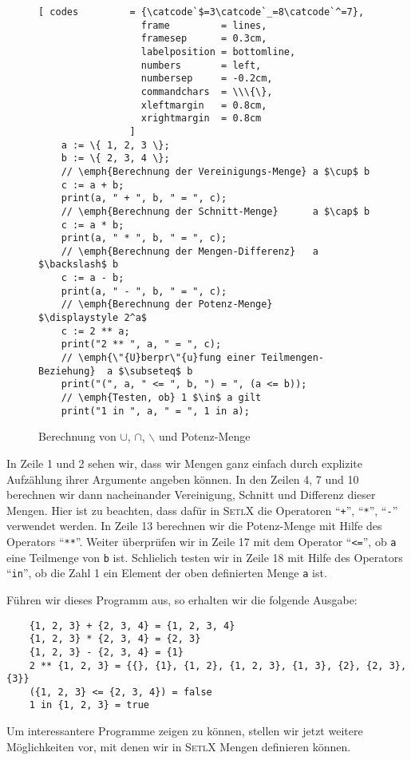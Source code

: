 \begin{figure}[!ht]
  \centering
\begin{Verbatim}[ codes         = {\catcode`$=3\catcode`_=8\catcode`^=7},
                  frame         = lines, 
                  framesep      = 0.3cm, 
                  labelposition = bottomline,
                  numbers       = left,
                  numbersep     = -0.2cm,
                  commandchars  = \\\{\},
                  xleftmargin   = 0.8cm,
                  xrightmargin  = 0.8cm
                ]
    a := \{ 1, 2, 3 \};
    b := \{ 2, 3, 4 \};
    // \emph{Berechnung der Vereinigungs-Menge} a $\cup$ b 
    c := a + b;
    print(a, " + ", b, " = ", c);
    // \emph{Berechnung der Schnitt-Menge}      a $\cap$ b
    c := a * b;
    print(a, " * ", b, " = ", c);
    // \emph{Berechnung der Mengen-Differenz}   a $\backslash$ b
    c := a - b;
    print(a, " - ", b, " = ", c);
    // \emph{Berechnung der Potenz-Menge}      $\displaystyle 2^a$
    c := 2 ** a;
    print("2 ** ", a, " = ", c);
    // \emph{\"{U}berpr\"{u}fung einer Teilmengen-Beziehung}  a $\subseteq$ b
    print("(", a, " <= ", b, ") = ", (a <= b)); 
    // \emph{Testen, ob} 1 $\in$ a gilt
    print("1 in ", a, " = ", 1 in a);
\end{Verbatim} 
\vspace*{-0.3cm}
\caption{Berechnung von $\cup$, $\cap$, $\backslash$ und Potenz-Menge}
  \label{fig:simple.stlx}
\end{figure} %

\noindent
In Zeile 1 und 2 sehen wir, dass wir Mengen ganz einfach durch explizite Aufz\"{a}hlung ihrer
Argumente angeben k\"{o}nnen.  In den Zeilen 4, 7 und 10 berechnen wir dann nacheinander 
Vereinigung, Schnitt und Differenz dieser Mengen.  Hier ist zu beachten, dass daf\"{u}r
in \textsc{SetlX} die Operatoren ``\texttt{+}'', ``\texttt{*}'', ``\texttt{-}''
verwendet werden.  
In Zeile 13 berechnen wir die Potenz-Menge mit Hilfe des Operators ``\texttt{**}''.
Weiter \"{u}berpr\"{u}fen wir in Zeile 17 mit dem Operator ``\texttt{<=}'', 
ob \texttt{a} eine Teilmenge von \texttt{b} ist.  Schlie\3lich testen wir in Zeile 18 mit Hilfe des
Operators ``\texttt{in}'', ob die Zahl 1 ein Element der oben definierten Menge \texttt{a} ist.

F\"{u}hren wir dieses Programm aus, so
erhalten wir die folgende Ausgabe:
\begin{verbatim}
    {1, 2, 3} + {2, 3, 4} = {1, 2, 3, 4}
    {1, 2, 3} * {2, 3, 4} = {2, 3}
    {1, 2, 3} - {2, 3, 4} = {1}
    2 ** {1, 2, 3} = {{}, {1}, {1, 2}, {1, 2, 3}, {1, 3}, {2}, {2, 3}, {3}}
    ({1, 2, 3} <= {2, 3, 4}) = false
    1 in {1, 2, 3} = true
\end{verbatim}
Um interessantere Programme zeigen zu k\"{o}nnen, stellen wir jetzt weitere
M\"{o}glichkeiten vor, mit denen wir in \textsc{SetlX} Mengen definieren k\"{o}nnen.


